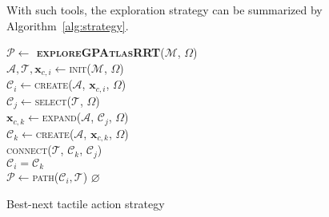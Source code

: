 With such tools, the exploration strategy can be summarized by Algorithm~\ref{alg:strategy}.
\begin{algorithm}[h]
    \textbf{$\mathcal{P} \leftarrow$ \textsc{exploreGPAtlasRRT}}($\mathcal{M}$, $\Omega$)\\ %
\LinesNumbered
\DontPrintSemicolon
\SetAlgoVlined {} 
$\mathcal{A}, \mathcal{T}, \mathbf{x}_{c,i} \leftarrow$\textsc{init}($\mathcal{M}$, $\Omega$) \\
$\mathcal{C}_{i} \leftarrow$\textsc{create}($\mathcal{A}$, $\mathbf{x}_{c,i}$, $\Omega$)\\
  {
    $\mathcal{C}_{j} \leftarrow$\textsc{select}($\mathcal{T}$, $\Omega$) \\
    $\mathbf{x}_{c,k} \leftarrow$\textsc{expand}($\mathcal{A}$, $\mathcal{C}_{j}$, $\Omega$) \\ 
    $\mathcal{C}_{k} \leftarrow$\textsc{create}($\mathcal{A}$, $\mathbf{x}_{c,k}$, $\Omega$) \\ 
    \textsc{connect}($\mathcal{T}$, $\mathcal{C}_{k}$, $\mathcal{C}_{j}$) \\
    $\mathcal{C}_{i} = \mathcal{C}_{k}$ \\
  }
  {\Return $\mathcal{P} \leftarrow$\textsc{path}($\mathcal{C}_{i}, \mathcal{T}$)}
  {\Return $\varnothing$}
  \caption{Best-next tactile action strategy} \label{alg:strategy}
\end{algorithm}

%


